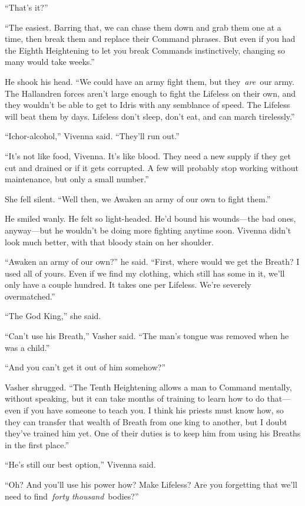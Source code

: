 “That’s it?”

“The easiest. Barring that, we can chase them down and grab them one at a time, then break them and replace their Command phrases. But even if you had the Eighth Heightening to let you break Commands instinctively, changing so many would take weeks.”

He shook his head. “We could have an army fight them, but they~\textit{are}~our army. The Hallandren forces aren’t large enough to fight the Lifeless on their own, and they wouldn’t be able to get to Idris with any semblance of speed. The Lifeless will beat them by days. Lifeless don’t sleep, don’t eat, and can march tirelessly.”

“Ichor-alcohol,” Vivenna said. “They’ll run out.”

“It’s not like food, Vivenna. It’s like blood. They need a new supply if they get cut and drained or if it gets corrupted. A few will probably stop working without maintenance, but only a small number.”

She fell silent. “Well then, we Awaken an army of our own to fight them.”

He smiled wanly. He felt so light-headed. He’d bound his wounds—the bad ones, anyway—but he wouldn’t be doing more fighting anytime soon. Vivenna didn’t look much better, with that bloody stain on her shoulder.

“Awaken an army of our own?” he said. “First, where would we get the Breath? I used all of yours. Even if we find my clothing, which still has some in it, we’ll only have a couple hundred. It takes one per Lifeless. We’re severely overmatched.”

“The God King,” she said.

“Can’t use his Breath,” Vasher said. “The man’s tongue was removed when he was a child.”

“And you can’t get it out of him somehow?”

Vasher shrugged. “The Tenth Heightening allows a man to Command mentally, without speaking, but it can take months of training to learn how to do that—even if you have someone to teach you. I think his priests must know how, so they can transfer that wealth of Breath from one king to another, but I doubt they’ve trained him yet. One of their duties is to keep him from using his Breaths in the first place.”

“He’s still our best option,” Vivenna said.

“Oh? And you’ll use his power how? Make Lifeless? Are you forgetting that we’ll need to find~\textit{forty thousand}~bodies?”


